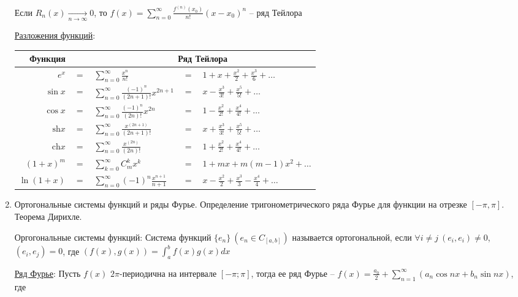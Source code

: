 \begin{enumerate}
    \Ths Если $R_n(x) \underset{n \to \infty}{\longrightarrow} 0$, то $f(x) = \sum_{n = 0}^\infty \frac{f^{(n)}(x_0)}{n!} (x - x_0)^n$ -- ряд Тейлора

    \hyperlink{taylorsseriesoffunctions}{Разложения функций}:

    \begin{tabular}{rclcl}
        Функция & & \multicolumn{3}{c}{Ряд Тейлора} \\
        \hline
        $e^x$ & $=$ & $\sum_{n = 0}^\infty \frac{x^n}{n!}$ & $=$ & $1 + x + \frac{x^2}{2} + \frac{x^3}{6} + \dots$ \\
        \hline
        $\sin x$ & $=$ & $\sum_{n = 0}^\infty \frac{(-1)^n}{(2n + 1)!}x^{2n + 1}$ & $=$ & $x - \frac{x^3}{3!} + \frac{x^5}{5!} + \dots$ \\
        \hline
        $\cos x$ & $=$ & $\sum_{n = 0}^\infty \frac{(-1)^n}{(2n)!}x^{2n}$ & $=$ & $1 - \frac{x^2}{2!} + \frac{x^4}{4!} + \dots$ \\
        \hline
        $\mathrm{sh} x$ & $=$ & $\sum_{n = 0}^\infty \frac{x^{(2n + 1)}}{(2n + 1)!}$ & $=$ & $x + \frac{x^3}{3!} + \frac{x^5}{5!} + \dots$\\
        \hline
        $\mathrm{ch} x$ & $=$ & $\sum_{n = 0}^\infty \frac{x^{(2n)}}{(2n)!}$  & $=$ & $1 + \frac{x^2}{2!} + \frac{x^4}{4!} + \dots$\\
        \hline 
        $(1 + x)^m$ & $=$ & $\sum_{k = 0}^\infty C_m^k x^k$ & $=$ & $1 + mx + m(m - 1)x^2 + \dots$\\
        \hline
        $\ln(1 + x)$ & $=$ & $\sum_{n = 0}^\infty (-1)^n \frac{x^{n + 1}}{n + 1}$ & $=$ & $x - \frac{x^2}{2} + \frac{x^3}{3} - \frac{x^4}{4} + \dots$ \\
    \end{tabular}

    \item Ортогональные системы функций и ряды Фурье. Определение тригонометрического ряда
    Фурье для функции на отрезке $[-\pi, \pi]$. Теорема Дирихле.

    Оргогональные системы функций: 
    Система функций $\{e_n\} \ (e_n \in C_{[a, b]})$ называется ортогональной, 
    если $\forall i \neq j \ (e_i, e_i) \neq 0$, $(e_i, e_j) = 0$, где
    $(f(x), g(x)) = \int_{a}^{b} f(x) g(x) dx$

    \hyperlink{fouriersseries}{Ряд Фурье}: Пусть $f(x)$ $2\pi$-периодична на интервале $[-\pi;\pi]$, тогда ее ряд Фурье -- $f(x) = \frac{a_0}{2} + \sum_{n = 1}^\infty (a_n \cos nx + b_n \sin nx)$, где 
    

\end{enumerate}

